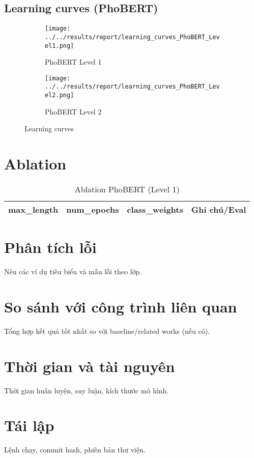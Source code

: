 \documentclass[12pt,a4paper]{article}
\begin{document}
\subsection{Learning curves (PhoBERT)}
\begin{figure}[H]
  \centering
  \begin{subfigure}[b]{0.49\linewidth}
    \centering
    \texttt{[image: ../../results/report/learning\_curves\_PhoBERT\_Level1.png]}
    \caption{PhoBERT Level 1}
  \end{subfigure}
  \begin{subfigure}[b]{0.49\linewidth}
    \centering
    \texttt{[image: ../../results/report/learning\_curves\_PhoBERT\_Level2.png]}
    \caption{PhoBERT Level 2}
  \end{subfigure}
  \caption{Learning curves}
\end{figure}

\section{Ablation}
\begin{table}[H]
  \centering
  \caption{Ablation PhoBERT (Level 1)}
  \begin{tabular}{llll}
    \toprule
    max\_length & num\_epochs & class\_weights & Ghi chú/Eval \\
    \midrule
    \bottomrule
  \end{tabular}
\end{table}

\section{Phân tích lỗi}
Nêu các ví dụ tiêu biểu và mẫu lỗi theo lớp.

\section{So sánh với công trình liên quan}
Tổng hợp kết quả tốt nhất so với baseline/related works (nếu có).

\section{Thời gian và tài nguyên}
Thời gian huấn luyện, suy luận, kích thước mô hình.

\section{Tái lập}
Lệnh chạy, commit hash, phiên bản thư viện.
\end{document}
